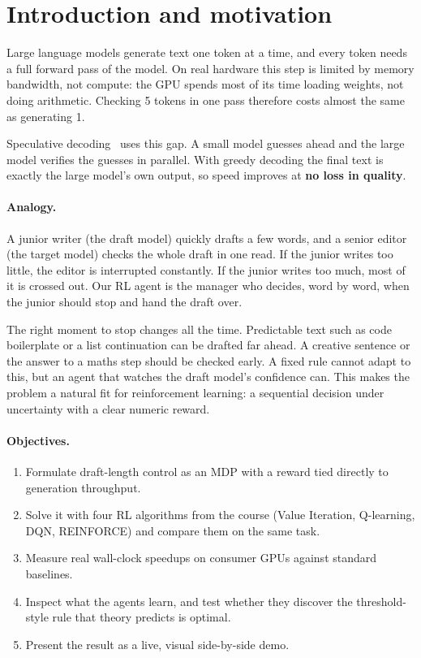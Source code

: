 \section{Introduction and motivation}

Large language models generate text one token at a time, and every token needs a full forward pass of the model. On real hardware this step is limited by memory bandwidth, not compute: the GPU spends most of its time loading weights, not doing arithmetic. Checking 5 tokens in one pass therefore costs almost the same as generating 1.

Speculative decoding~\citep{leviathan2023fast,chen2023accelerating} uses this gap. A small model guesses ahead and the large model verifies the guesses in parallel. With greedy decoding the final text is exactly the large model's own output, so speed improves at \textbf{no loss in quality}.

\paragraph{Analogy.} A junior writer (the draft model) quickly drafts a few words, and a senior editor (the target model) checks the whole draft in one read. If the junior writes too little, the editor is interrupted constantly. If the junior writes too much, most of it is crossed out. Our RL agent is the manager who decides, word by word, when the junior should stop and hand the draft over.

The right moment to stop changes all the time. Predictable text such as code boilerplate or a list continuation can be drafted far ahead. A creative sentence or the answer to a maths step should be checked early. A fixed rule cannot adapt to this, but an agent that watches the draft model's confidence can. This makes the problem a natural fit for reinforcement learning: a sequential decision under uncertainty with a clear numeric reward.

\paragraph{Objectives.}
\begin{enumerate}
  \item Formulate draft-length control as an MDP with a reward tied directly to generation throughput.
  \item Solve it with four RL algorithms from the course (Value Iteration, Q-learning, DQN, REINFORCE) and compare them on the same task.
  \item Measure real wall-clock speedups on consumer GPUs against standard baselines.
  \item Inspect what the agents learn, and test whether they discover the threshold-style rule that theory predicts is optimal.
  \item Present the result as a live, visual side-by-side demo.
\end{enumerate}

